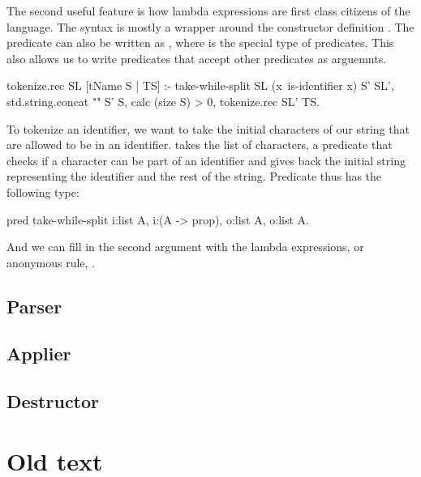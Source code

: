 \documentclass[thesis.tex]{subfiles}
\begin{document}
{{The second useful feature is how lambda expressions are first class citizens of the language. The  syntax is mostly a wrapper around the constructor definition . The predicate  can also be written as , where  is the special type of predicates. This also allows us to write predicates that accept other predicates as arguemnts.
\begin{elpicode}
  tokenize.rec SL [tName S | TS] :-
    take-while-split SL (x\ is-identifier x) S' SL',
    std.string.concat "" S' S,
    { calc (size S) } > 0,
    tokenize.rec SL' TS.
\end{elpicode}
To tokenize an identifier, we want to take the initial characters of our string that are allowed to be in an identifier.  takes the list of characters, a predicate that checks if a character can be part of an identifier and gives back the initial string representing the identifier and the rest of the string. Predicate  thus has the following type:
\begin{elpicode}
  pred take-while-split i:list A, i:(A -> prop), o:list A, o:list A.
\end{elpicode}
And we can fill in the second argument with the lambda expressions, or anonymous rule, .




\subsection{Parser}


\subsection{Applier}\label{ss:applier}

\subsection{Destructor}

\section{Old text}

}}
\end{document}
